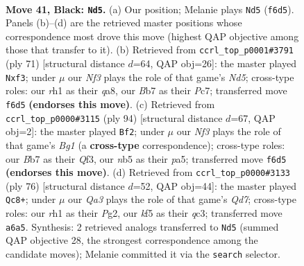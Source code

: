 \documentclass[11pt]{article}
\begin{document}
\clearpage

\begin{figure}[p]\centering
\begin{subfigure}{0.46\textwidth}\centering
\resizebox{\linewidth}{!}{%
\newchessgame
\chessboard[
  setfen={7Q/1b2kp2/qp3n2/1N3K2/P2Pp3/6R1/8/7R b - - 2 41},
  showmover=false,
  pgfstyle=straightmove, color=movearrow, markmove={f6-d5}
]}
\caption{}
\end{subfigure}\hfill
\begin{subfigure}{0.46\textwidth}\centering
\resizebox{\linewidth}{!}{%
\newchessgame
\chessboard[
  setfen={Q7/2p4p/p4kp1/8/1p1n1q2/3K1P2/PP6/4R3 b - - 12 36},
  showmover=false,
  pgfstyle=straightmove, color=movearrow, markmove={d4-f3}
]}
\caption{}
\end{subfigure}
\\[4pt]
\begin{subfigure}{0.46\textwidth}\centering
\resizebox{\linewidth}{!}{%
\newchessgame
\chessboard[
  setfen={4r1k1/1P4p1/7p/p1N2p2/5P2/5Q2/3q3P/6BK w - - 13 48},
  showmover=false,
  pgfstyle=straightmove, color=movearrow, markmove={g1-f2}
]}
\caption{}
\end{subfigure}\hfill
\begin{subfigure}{0.46\textwidth}\centering
\resizebox{\linewidth}{!}{%
\newchessgame
\chessboard[
  setfen={1k6/3Q4/2p5/1p1n1B2/6p1/2q1P1P1/p1N1KPP1/8 w - - 0 39},
  showmover=false,
  pgfstyle=straightmove, color=movearrow, markmove={d7-c8}
]}
\caption{}
\end{subfigure}
\caption{\textbf{Move 41, Black: \texttt{Nd5}.} (a) Our position; Melanie plays \texttt{Nd5} (\texttt{f6d5}). Panels (b)--(d) are the retrieved master positions whose correspondence most drove this move (highest QAP objective among those that transfer to it). (b) Retrieved from \texttt{ccrl\_top\_p0001\#3791} (ply 71) [structural distance $d$=64, QAP obj=26]: the master played \texttt{Nxf3}; under $\mu$ our \emph{Nf3} plays the role of that game's \emph{Nd5}; cross-type roles: our \emph{r}h1 as their \emph{q}a8, our \emph{B}b7 as their \emph{P}c7; transferred move \texttt{f6d5} \textbf{(endorses this move)}. (c) Retrieved from \texttt{ccrl\_top\_p0000\#3115} (ply 94) [structural distance $d$=67, QAP obj=2]: the master played \texttt{Bf2}; under $\mu$ our \emph{Nf3} plays the role of that game's \emph{Bg1} (a \textbf{cross-type} correspondence); cross-type roles: our \emph{B}b7 as their \emph{Q}f3, our \emph{n}b5 as their \emph{p}a5; transferred move \texttt{f6d5} \textbf{(endorses this move)}. (d) Retrieved from \texttt{ccrl\_top\_p0000\#3133} (ply 76) [structural distance $d$=52, QAP obj=44]: the master played \texttt{Qc8+}; under $\mu$ our \emph{Qa3} plays the role of that game's \emph{Qd7}; cross-type roles: our \emph{r}h1 as their \emph{P}g2, our \emph{k}f5 as their \emph{q}c3; transferred move \texttt{a6a5}. Synthesis: 2 retrieved analogs transferred to \texttt{Nd5} (summed QAP objective 28, the strongest correspondence among the candidate moves); Melanie committed it via the \texttt{search} selector.}
\label{fig:thought-m81}
\end{figure}
\end{document}
